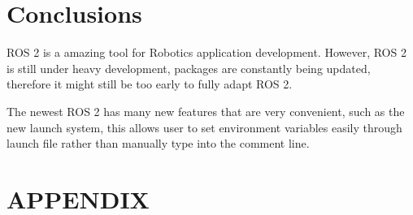 \documentclass[letterpaper, 10 pt, conference]{ieeeconf}  %
\begin{document}
\section{Conclusions}\label{conclusions}
ROS 2 is a amazing tool for Robotics application development. However, ROS 2 is still under heavy development, packages are constantly being updated, therefore it might still be too early to fully adapt ROS 2. 

The newest ROS 2 has many new features that are very convenient, such as the new launch system, this allows user to set environment variables easily through launch file rather than manually type into the comment line. 
\addtolength{\textheight}{-12cm}   %

\section*{APPENDIX}

\end{document}

